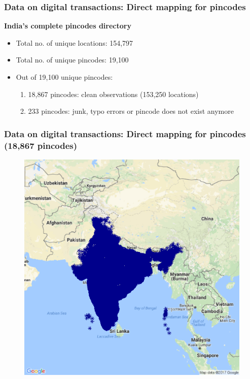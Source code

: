 \documentclass{beamer}\usepackage[]{graphicx}\usepackage[]{color}
\begin{document}
\begin{frame}
  \frametitle{Data on digital transactions: Direct mapping for pincodes}
  \begin{footnotesize}
    \textbf{India's complete pincodes directory}
    \begin{itemize}
    \item Total no. of unique locations: 154,797
    \item Total no. of unique pincodes: 19,100
    \item Out of 19,100 unique pincodes:
      \begin{enumerate}
      \item 18,867 pincodes: clean observations (153,250 locations)
      \item 233 pincodes: junk, typo errors or pincode does not exist anymore 
      \end{enumerate}
    \end{itemize}
  \end{footnotesize}
\end{frame}

\begin{frame}
  \frametitle{Data on digital transactions: Direct mapping for pincodes (18,867 pincodes)}
  \begin{figure}
    \includegraphics[scale = 0.45]{GRAPHS/india_pin_map.png}
  \end{figure}
\end{frame}
\end{document}
